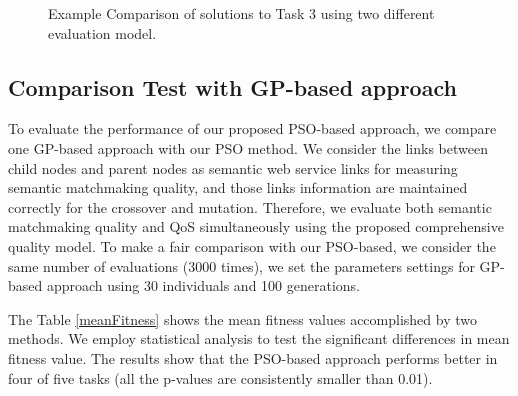 \documentclass{IEEEtran}
\begin{document}
\begin{figure}[h]
 \caption{Example Comparison of solutions to Task 3 using two different evaluation model.}
 \label{comparisontest}
\end{figure}

\subsection{Comparison Test with GP-based approach}\label{comparisonTestWithGP}
To evaluate the performance of our proposed PSO-based approach, we compare one GP-based approach  \cite{ma2015hybrid} with our PSO method. We consider the links between child nodes and parent nodes as semantic web service links for measuring  semantic matchmaking quality, and those links information are maintained correctly for the crossover and mutation. Therefore, we evaluate both semantic matchmaking quality and QoS simultaneously using the proposed comprehensive quality model. To make a fair comparison with our PSO-based, we consider the same number of evaluations (3000 times), we set the parameters settings for GP-based approach \cite{ma2015hybrid} using 30 individuals and 100 generations.

The Table \ref{meanFitness} shows the mean fitness values accomplished by two methods. We employ statistical analysis to test the significant differences in mean fitness value. The results show that the PSO-based approach performs better in four of five tasks (all the p-values are consistently smaller than 0.01).
\end{document}
